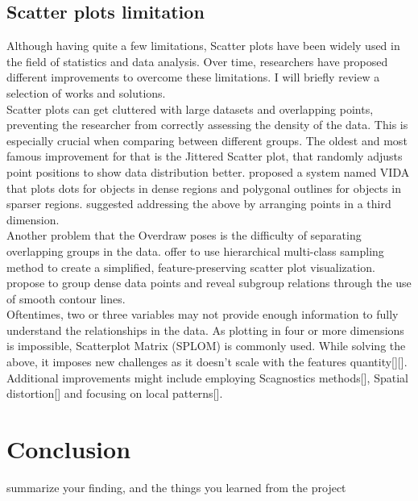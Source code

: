 \documentclass[11pt]{article}
\begin{document}
\subsection{Scatter plots limitation}\label{Scatter plots limitation}
Although having quite a few limitations, Scatter plots have been widely used in the field of statistics and data analysis. Over time, researchers have proposed different improvements to overcome these limitations. I will briefly review a selection of works and solutions.\\
Scatter plots can get cluttered with large datasets and overlapping points, preventing the researcher from correctly assessing the density of the data. This is especially crucial when comparing between different groups. The oldest and most famous improvement for that is the Jittered Scatter plot, that randomly adjusts point positions to show data distribution better. \cite{woodruff1998constant} proposed a system named VIDA that plots dots for objects in dense regions and polygonal outlines for objects in sparser regions. \cite{dang2010stacking} suggested addressing the above by arranging points in a third dimension.\\
Another problem that the Overdraw poses is the difficulty of separating overlapping groups in the data. \cite{lee2012ieee} offer to use hierarchical multi-class sampling method to create a simplified, feature-preserving scatter plot visualization. \cite{mayorga2013splatterplots} propose to group dense data points and reveal subgroup relations through the use of smooth contour lines.\\
Oftentimes, two or three variables may not provide enough information to fully understand the relationships in the data. As plotting in four or more dimensions is impossible, Scatterplot Matrix (SPLOM) is commonly used. While solving the above, it imposes new challenges as it doesn’t scale with the features quantity[][].\\
Additional improvements might include employing Scagnostics methods[], Spatial distortion[] and focusing on local patterns[].

\section{Conclusion}\label{Conclusion}
summarize your finding, and the things you learned from
the project



\end{document}
